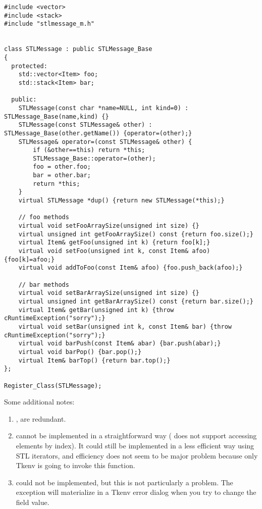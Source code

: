\begin{verbatim}
#include <vector>
#include <stack>
#include "stlmessage_m.h"


class STLMessage : public STLMessage_Base
{
  protected:
    std::vector<Item> foo;
    std::stack<Item> bar;

  public:
    STLMessage(const char *name=NULL, int kind=0) : STLMessage_Base(name,kind) {}
    STLMessage(const STLMessage& other) : STLMessage_Base(other.getName()) {operator=(other);}
    STLMessage& operator=(const STLMessage& other) {
        if (&other==this) return *this;
        STLMessage_Base::operator=(other);
        foo = other.foo;
        bar = other.bar;
        return *this;
    }
    virtual STLMessage *dup() {return new STLMessage(*this);}

    // foo methods
    virtual void setFooArraySize(unsigned int size) {}
    virtual unsigned int getFooArraySize() const {return foo.size();}
    virtual Item& getFoo(unsigned int k) {return foo[k];}
    virtual void setFoo(unsigned int k, const Item& afoo) {foo[k]=afoo;}
    virtual void addToFoo(const Item& afoo) {foo.push_back(afoo);}

    // bar methods
    virtual void setBarArraySize(unsigned int size) {}
    virtual unsigned int getBarArraySize() const {return bar.size();}
    virtual Item& getBar(unsigned int k) {throw cRuntimeException("sorry");}
    virtual void setBar(unsigned int k, const Item& bar) {throw cRuntimeException("sorry");}
    virtual void barPush(const Item& abar) {bar.push(abar);}
    virtual void barPop() {bar.pop();}
    virtual Item& barTop() {return bar.top();}
};

Register_Class(STLMessage);
\end{verbatim}

Some additional notes:

\begin{enumerate}
  \item{,  are redundant.}
  \item{ cannot be implemented in a straightforward way
     ( does not support accessing elements by index).
     It could still be implemented in a less efficient way using STL iterators,
     and efficiency does not seem to be major problem because only Tkenv
     is going to invoke this function.}
  \item{ could not be implemented, but this
     is not particularly a problem. The exception will materialize in a
     Tkenv error dialog when you try to change the field value.}
\end{enumerate}

